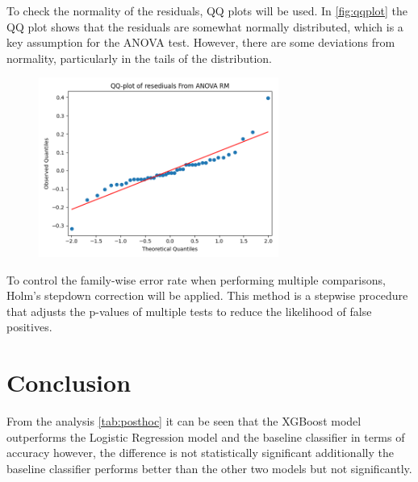 	To check the normality of the residuals, QQ plots will be used. In \autoref{fig:qqplot} the QQ plot shows that
		the residuals are somewhat normally distributed, which is a key assumption for the ANOVA test.
		However, there are some deviations from normality, particularly in the tails of the distribution.

	\begin{figure}
		\centering
		\includegraphics[width=0.7\textwidth]{Part2/qqplot}
		\caption{}
	    \label{fig:qqplot}
	\end{figure}

	To control the family-wise error rate when performing multiple comparisons, Holm's stepdown correction will be
		applied.
		This method is a stepwise procedure that adjusts the p-values of multiple tests to reduce the likelihood of
	false positives.

		

		
\section{Conclusion}
From the analysis \autoref{tab:posthoc} it can be seen that the XGBoost model outperforms the Logistic Regression model
		and the baseline classifier in terms of accuracy however, the difference is not statistically significant
	additionally the baseline classifier performs better than the other two models but not significantly.

